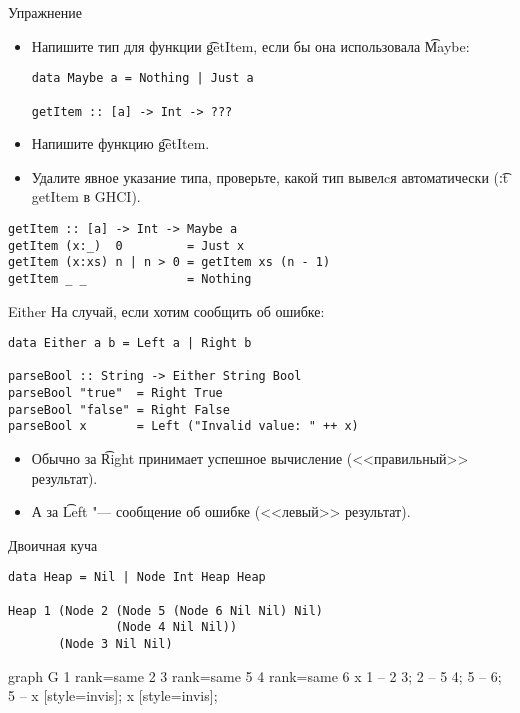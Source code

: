 \begin{frame}[t,fragile]{Упражнение}
	\begin{itemize}
		\item Напишите тип для функции \t{getItem}, если бы она использовала \t{Maybe}:
\begin{verbatim}
data Maybe a = Nothing | Just a

getItem :: [a] -> Int -> ???
\end{verbatim}
		\item Напишите функцию \t{getItem}.
		\item Удалите явное указание типа, проверьте, какой тип вывелcя автоматически (\t{:t getItem} в GHCI).
	\end{itemize}
	\pause
\begin{verbatim}
getItem :: [a] -> Int -> Maybe a
getItem (x:_)  0         = Just x
getItem (x:xs) n | n > 0 = getItem xs (n - 1)
getItem _ _              = Nothing
\end{verbatim}
\end{frame}

\begin{frame}[fragile]{Either}
	На случай, если хотим сообщить об ошибке:
\begin{verbatim}
data Either a b = Left a | Right b

parseBool :: String -> Either String Bool
parseBool "true"  = Right True
parseBool "false" = Right False
parseBool x       = Left ("Invalid value: " ++ x)
\end{verbatim}
	\begin{itemize}
		\item Обычно за \t{Right} принимает успешное вычисление (<<правильный>> результат).
		\item А за \t{Left} "--- сообщение об ошибке (<<левый>> результат).
	\end{itemize}
\end{frame}

\begin{frame}[fragile]{Двоичная куча}
\begin{verbatim}
data Heap = Nil | Node Int Heap Heap

Heap 1 (Node 2 (Node 5 (Node 6 Nil Nil) Nil)
               (Node 4 Nil Nil))
       (Node 3 Nil Nil)
\end{verbatim}
	\begin{center}
		\begin{dot2tex}[scale=0.5,options=-tmath]
			graph G {
			    1 {rank=same 2 3} {rank=same 5 4} { rank=same 6 x }
			    1 -- {2 3};
			    2 -- {5 4};
			    5 -- 6;
			    5 -- x [style=invis];
			    x [style=invis];
			}
		\end{dot2tex}
	\end{center}
\end{frame}

